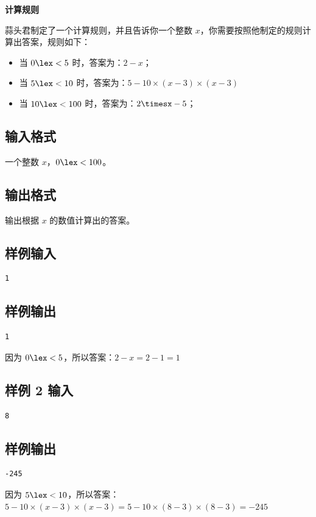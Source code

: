 \documentclass{article}
\newcommand{\problemname}[1]{\begin{center}\Large\bfseries #1\end{center}}
\begin{document}
\problemname{计算规则}

蒜头君制定了一个计算规则，并且告诉你一个整数 $x$，你需要按照他制定的规则计算出答案，规则如下：

\begin{itemize}
  \item 当 $0\lex<5$ 时，答案为：$2-x$；

  \item 当 $5\lex<10$ 时，答案为：$5-10\times(x-3)\times(x-3)$

  \item 当 $10\lex<100$ 时，答案为：$2\timesx-5$；

\end{itemize}
\subsection*{输入格式}
一个整数 $x$，$0\lex<100$。

\subsection*{输出格式}
输出根据 $x$ 的数值计算出的答案。

\subsection*{样例输入}
\begin{verbatim}
1
\end{verbatim}

\subsection*{样例输出}
\begin{verbatim}
1
\end{verbatim}

因为 $0\lex<5$，所以答案：$2-x=2-1=1$

\subsection*{样例 2 输入}
\begin{verbatim}
8
\end{verbatim}

\subsection*{样例输出}
\begin{verbatim}
-245
\end{verbatim}

因为 $5\lex<10$，所以答案：$5-10\times(x-3)\times(x-3)=5-10\times(8-3)\times(8-3)=-245$
\end{document}
